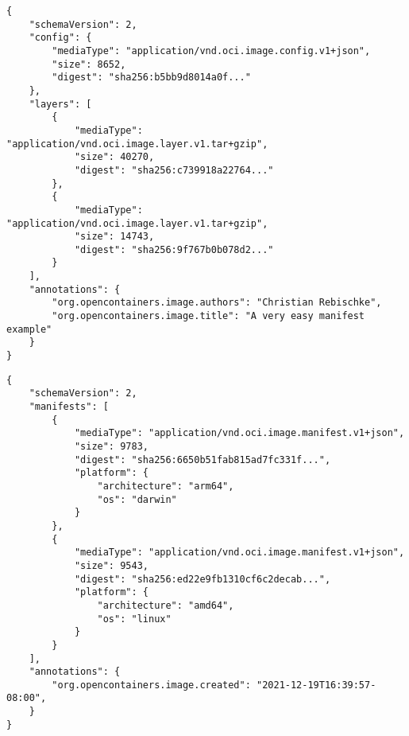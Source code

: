 \documentclass[titlepage]{report}
\begin{document}
\begin{minipage}{\linewidth}
\begin{lstlisting}[caption={An OCI image manifest with two layers, shortened sha256 checksums and two annotations},label={lst:imageManifest}]
{
    "schemaVersion": 2,
    "config": {
        "mediaType": "application/vnd.oci.image.config.v1+json",
        "size": 8652,
        "digest": "sha256:b5bb9d8014a0f..."
    },
    "layers": [
        {
            "mediaType": "application/vnd.oci.image.layer.v1.tar+gzip",
            "size": 40270,
            "digest": "sha256:c739918a22764..."
        },
        {
            "mediaType": "application/vnd.oci.image.layer.v1.tar+gzip",
            "size": 14743,
            "digest": "sha256:9f767b0b078d2..."
        }
    ],
    "annotations": {
        "org.opencontainers.image.authors": "Christian Rebischke",
        "org.opencontainers.image.title": "A very easy manifest example"
    }
}
\end{lstlisting}
\end{minipage}
\begin{minipage}{\linewidth}
\begin{lstlisting}[caption={An OCI image index with multiple manifests, shortened sha256 checksums and platform specifications},label={lst:imageIndex}]
{
    "schemaVersion": 2,
    "manifests": [
        {
            "mediaType": "application/vnd.oci.image.manifest.v1+json",
            "size": 9783,
            "digest": "sha256:6650b51fab815ad7fc331f...",
            "platform": {
                "architecture": "arm64",
                "os": "darwin"
            }
        },
        {
            "mediaType": "application/vnd.oci.image.manifest.v1+json",
            "size": 9543,
            "digest": "sha256:ed22e9fb1310cf6c2decab...",
            "platform": {
                "architecture": "amd64",
                "os": "linux"
            }
        }
    ],
    "annotations": {
        "org.opencontainers.image.created": "2021-12-19T16:39:57-08:00",
    }
}
\end{lstlisting}
\end{minipage}
\end{document}
